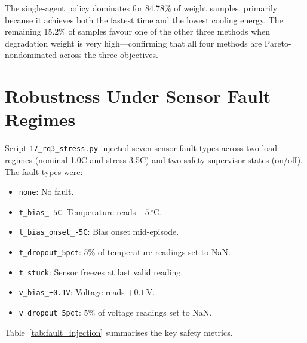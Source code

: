 The single-agent policy dominates for 84.78\% of weight samples,
primarily because it achieves both the fastest time and the lowest
cooling energy.  The remaining 15.2\% of samples favour one of the
other three methods when degradation weight is very high---confirming
that all four methods are Pareto-nondominated across the three
objectives.

\section{Robustness Under Sensor Fault Regimes}

Script \texttt{17\_rq3\_stress.py} injected seven sensor fault types
across two load regimes (nominal 1.0C and stress 3.5C) and two
safety-supervisor states (on/off).  The fault types were:
\begin{itemize}
  \item \texttt{none}: No fault.
  \item \texttt{t\_bias\_{-}5C}: Temperature reads $-5\,^\circ\mathrm{C}$.
  \item \texttt{t\_bias\_onset\_{-}5C}: Bias onset mid-episode.
  \item \texttt{t\_dropout\_5pct}: 5\% of temperature readings set to NaN.
  \item \texttt{t\_stuck}: Sensor freezes at last valid reading.
  \item \texttt{v\_bias\_{+}0.1V}: Voltage reads $+0.1\,\mathrm{V}$.
  \item \texttt{v\_dropout\_5pct}: 5\% of voltage readings set to NaN.
\end{itemize}

Table~\ref{tab:fault_injection} summarises the key safety metrics.

